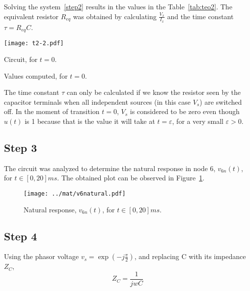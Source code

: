 Solving the system~\ref{step2} results in the values in the Table~\ref{tab:teo2}. The equivalent resistor $R_{eq}$ was obtained by calculating $\frac{V_x}{I_x}$ and the time constant $\tau=R_{eq}C$.


\begin{minipage}[b]{0.48\textwidth}
\centering
    \texttt{[image: t2-2.pdf]}
    \captionsetup{type=figure}
\caption{Circuit, for $t=0$.}
\label{fig:t2-2}
\end{minipage}
\begin{minipage}[b]{0.48\textwidth}
\centering
    
    \captionsetup{type=table}
  \caption{Values computed, for $t=0$.}
  \label{tab:teo2}
\end{minipage}



The time constant $\tau$ can only be calculated if we know the resistor seen by the capacitor terminals when all independent sources (in this case $V_s$) are switched off. In the moment of transition $t=0$, $V_s$ is considered to be zero even though $u(t)$ is 1 because that is the value it will take at $t=\varepsilon$, for a very small $\varepsilon > 0$.

\FloatBarrier

\vspace{-12pt}
\subsection{Step 3}
The circuit was analyzed to determine the natural response in node 6, $v_{6n}(t)$, for $t\in [0,20]ms$. The obtained plot can be observed in Figure~\ref{fig:v6n}.

\begin{figure}[ht!]
  \centering
  \texttt{[image: ../mat/v6natural.pdf]}
  \caption{Natural response, $v_{6n}(t)$, for $t\in [0,20]ms$.}
  \label{fig:v6n}
\end{figure}
\FloatBarrier





\vspace{-12pt}
\subsection{Step 4}
Using the phasor voltage $v_s=\exp{(-j\frac{\pi}{2})}$, and replacing C with its impedance $Z_C$,
\begin{equation}
    Z_C=\frac{1}{jwC}
    \label{Zc}
\end{equation}

